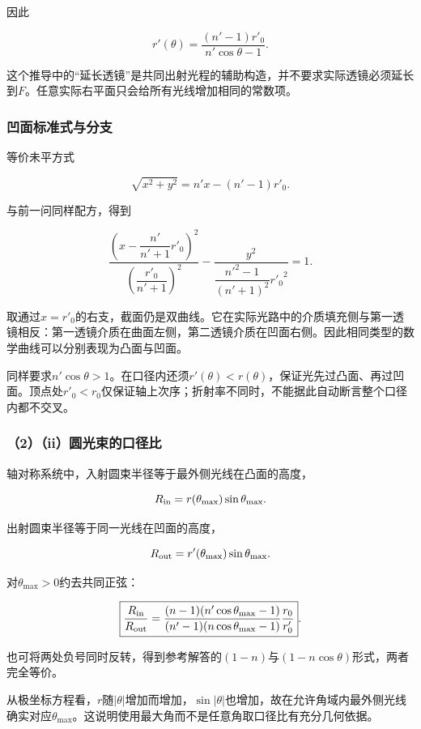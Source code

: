 \documentclass[12pt,a4paper,fontset=fandol]{ctexart}
\begin{document}
因此

\[
\boxed{
r'(\theta)=\frac{(n'-1)r'_0}{n'\cos\theta-1}}.
\]

这个推导中的``延长透镜''是共同出射光程的辅助构造，并不要求实际透镜必须延长到\(F\)。任意实际右平面只会给所有光线增加相同的常数项。

\subsubsection{凹面标准式与分支}\label{ux51f9ux9762ux6807ux51c6ux5f0fux4e0eux5206ux652f}

等价未平方式

\[
\sqrt{x^2+y^2}=n'x-(n'-1)r'_0.
\]

与前一问同样配方，得到

\[
\boxed{
\frac{\left(x-\dfrac{n'}{n'+1}r'_0\right)^2}
{\left(\dfrac{r'_0}{n'+1}\right)^2}
-\frac{y^2}{\dfrac{n'^2-1}{(n'+1)^2}{r'_0}^2}=1}.
\]

取通过\(x=r'_0\)的右支，截面仍是双曲线。它在实际光路中的介质填充侧与第一透镜相反：第一透镜介质在曲面左侧，第二透镜介质在凹面右侧。因此相同类型的数学曲线可以分别表现为凸面与凹面。

同样要求\(n'\cos\theta>1\)。在口径内还须\(r'(\theta)<r(\theta)\)，保证光先过凸面、再过凹面。顶点处\(r'_0<r_0\)仅保证轴上次序；折射率不同时，不能据此自动断言整个口径内都不交叉。

\subsubsection{（2）（ii）圆光束的口径比}\label{iiux5706ux5149ux675fux7684ux53e3ux5f84ux6bd4}

轴对称系统中，入射圆束半径等于最外侧光线在凸面的高度，

\[
R_{\rm in}=r(\theta_{\max})\sin\theta_{\max}.
\]

出射圆束半径等于同一光线在凹面的高度，

\[
R_{\rm out}=r'(\theta_{\max})\sin\theta_{\max}.
\]

对\(\theta_{\max}>0\)约去共同正弦：

\[
\boxed{
\frac{R_{\rm in}}{R_{\rm out}}
=\frac{(n-1)(n'\cos\theta_{\max}-1)}
{(n'-1)(n\cos\theta_{\max}-1)}
\frac{r_0}{r'_0}}.
\]

也可将两处负号同时反转，得到参考解答的\((1-n)\)与\((1-n\cos\theta)\)形式，两者完全等价。

从极坐标方程看，\(r\)随\(|\theta|\)增加而增加，\(\sin|\theta|\)也增加，故在允许角域内最外侧光线确实对应\(\theta_{\max}\)。这说明使用最大角而不是任意角取口径比有充分几何依据。
\end{document}
